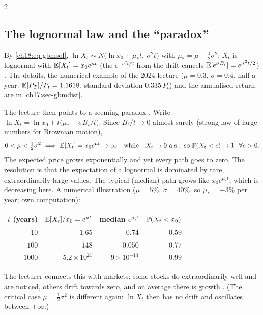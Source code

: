 \begin{paracol}{2}
\subsection{The lognormal law and the ``paradox''}
By \eqref{ch18:eq-gbmsol}, $\ln X_t\sim N\bigl(\ln x_0+\mu_*t,\ \sigma^2t\bigr)$ with $\mu_*=\mu-\tfrac12\sigma^2$: $X_t$ is lognormal with $\mathbb{E}[X_t]=x_0e^{\mu t}$ (the $e^{-\sigma^2t/2}$ from the drift cancels $\mathbb{E}[e^{\sigma B_t}]=e^{\sigma^2t/2}$) . The details, the numerical example of the 2024 lecture ($\mu=0.3$, $\sigma=0.4$, half a year: $\mathbb{E}[P_T]/P_t=1.1618$, standard deviation $0.335\,P_t$) and the annualised return are in \cref{ch17:sec-gbmdist}.

The lecture then points to a seeming paradox . Write $\ln X_t=\ln x_0+t\bigl(\mu_*+\sigma B_t/t\bigr)$. Since $B_t/t\to0$ almost surely (strong law of large numbers for Brownian motion),
\begin{equation}\label{ch18:eq-paradox}
  0<\mu<\tfrac12\sigma^2\ \Longrightarrow\ \mathbb{E}[X_t]=x_0e^{\mu t}\to\infty\quad\text{while}\quad X_t\to0\ \text{a.s.},\ \text{so }\mathbb{P}(X_t<c)\to1\ \ \forall c>0 .
\end{equation}
The expected price grows exponentially and yet every path goes to zero. The resolution is that the expectation of a lognormal is dominated by rare, extraordinarily large values. The typical (median) path grows like $x_0e^{\mu_*t}$, which is decreasing here. A numerical illustration ($\mu=5\%$, $\sigma=40\%$, so $\mu_*=-3\%$ per year; own computation):
\begin{center}
\small
\begin{tabular}{@{}rrrr@{}}
\toprule
$t$ (years) & $\mathbb{E}[X_t]/x_0=e^{\mu t}$ & median $e^{\mu_*t}$ & $\mathbb{P}(X_t<x_0)$\\
\midrule
$10$ & $1.65$ & $0.74$ & $0.59$\\
$100$ & $148$ & $0.050$ & $0.77$\\
$1000$ & $5.2\times10^{21}$ & $9\times10^{-14}$ & $0.99$\\
\bottomrule
\end{tabular}
\end{center}
The lecturer connects this with markets: some stocks do extraordinarily well and are noticed, others drift towards zero, and on average there is growth . (The critical case $\mu=\tfrac12\sigma^2$ is different again: $\ln X_t$ then has no drift and oscillates between $\pm\infty$.)
\begin{intuition}

\end{intuition}
\end{paracol}

